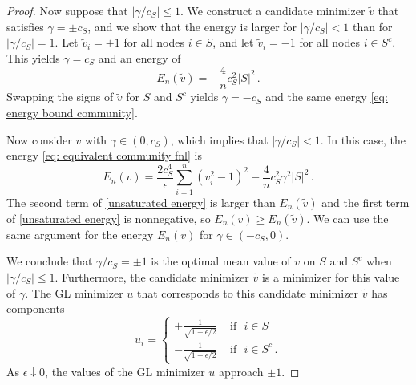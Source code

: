 \documentclass[10pt,a4paper]{amsart}
\def\ep{\epsilon}
\begin{document}
\begin{proof}
Now suppose that $\left|{\gamma}/{c_S}\right| \leq 1$. We construct a candidate minimizer $\tilde{v}$ that satisfies $\gamma = \pm c_S$, and we show that the energy is larger for {$|\gamma/c_S| < 1$ than for $|\gamma/c_S| = 1$.} 
Let $\tilde{v}_i = +1$ for all nodes $i \in S$, and let $\tilde{v}_i = -1$ for all nodes $i \in S^c$. This yields $\gamma = c_S$ and an energy of
\begin{equation} \label{eq: energy bound community}
    E_n(\tilde{v}) = - \frac{4}{n} c_S^2 |S|^2 \,.
\end{equation}
Swapping the signs of $\tilde{v}$ for $S$ and $S^c$ yields $\gamma = -c_S$ and the {same energy \eqref{eq: energy bound community}}. 

Now consider $v$ with $\gamma \in (0, c_S)$, which implies that $|\gamma/c_S| < 1$. {In this case, the energy \eqref{eq: equivalent community fnl} is}
\begin{equation}\label{unsaturated energy}
    E_n(v) =  \frac{2c_S^4}{\ep} \sum_{i = 1}^n (v_i^2 - 1)^2  - \frac{4}{n} c_S^2 \gamma^2 |S|^2 \,.
\end{equation} 
The second term of \eqref{unsaturated energy} is larger than $E_n(\tilde{v})$ and the first term of \eqref{unsaturated energy} is nonnegative, so $E_n(v) \geq E_n(\tilde{v})$. 
We can use the same argument for the energy $E_n(v)$ for $\gamma \in (-c_S, 0)$. 

We conclude that ${\gamma}/{c_S} = \pm 1$ is the optimal mean value of $v$ on $S$ and $S^c$ when $\left|{\gamma}/{c_S}\right| \leq 1$. Furthermore, the candidate minimizer $\tilde{v}$ is {a} minimizer for this value of $\gamma$. 
The GL minimizer $u$ {that corresponds to this candidate minimizer $\tilde{v}$} has components
\begin{equation}
    u_i = \begin{cases}
        +\frac{1}{\sqrt{1 - \ep/2}} &\text{ if }\,\, i\in S 
        \\
        -\frac{1}{\sqrt{1 - \ep/2}} &\text{ if } \,\, i\in S^c \,. 
    \end{cases}
\end{equation}
{As $\ep \downarrow 0$, the values of the {GL} minimizer $u$ approach $\pm 1$.}

\end{proof}
\end{document}
